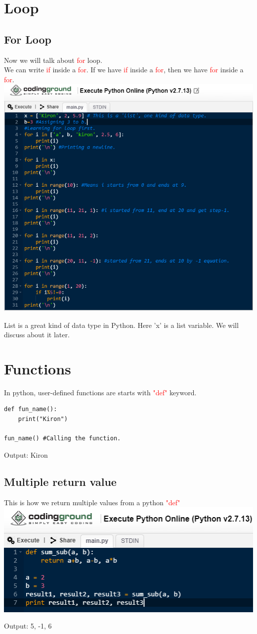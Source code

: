 \documentclass[11 pt, letterpaper]{report}
\begin{document}
\section{Loop}
\subsection{For Loop}
Now we will talk about \textcolor{red}{for} loop.\\
We can write \textcolor{red}{if} inside a \textcolor{red}{for}. If we have \textcolor{red}{if} inside a \textcolor{red}{for}, then we have \textcolor{red}{for} inside a \textcolor{red}{for}.\\
\includegraphics[width=260 px, height=230 px]{For Loop practice.png}

List is a great kind of data type in Python. Here 'x' is a list variable. We will discuss about it later.

\section{Functions}
In python, user-defined functions are starts with \textcolor{red}{"def"} keyword.
\begin{lstlisting}
def fun_name():
	print("Kiron")
	
fun_name() #Calling the function.
\end{lstlisting}
\begin{tcolorbox}
Output: Kiron
\end{tcolorbox}

\subsection{Multiple return value}
This is how we return multiple values from a python \textcolor{red}{"def"}\\
\centering
\includegraphics[width=200 px]{Multiple return value from function def.png}
\begin{tcolorbox}
Output: 5, -1, 6
\end{tcolorbox}
\end{document}
